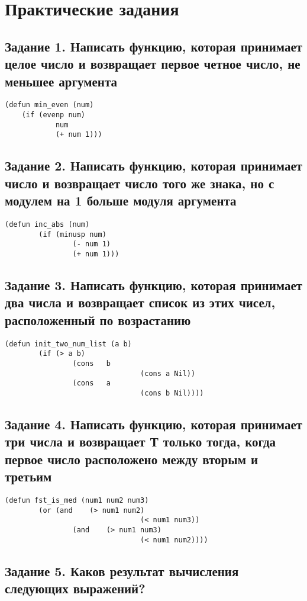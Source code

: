 \chapter{Практические задания}

\section{Задание 1. Написать функцию, которая принимает целое число и возвращает первое четное число, не меньшее аргумента}

\begin{lstlisting}
(defun min_even (num)
	(if (evenp num)
			num
			(+ num 1)))
\end{lstlisting}

\section{Задание 2. Написать функцию, которая принимает число и возвращает число того же знака, но с модулем на 1 больше модуля аргумента}

\begin{lstlisting}
(defun inc_abs (num)
		(if (minusp num)
				(- num 1)
				(+ num 1)))
\end{lstlisting}

\section{Задание 3. Написать функцию, которая принимает два числа и возвращает список из этих чисел, расположенный по возрастанию}

\begin{lstlisting}
(defun init_two_num_list (a b)
		(if (> a b)
				(cons   b
								(cons a Nil))
				(cons   a
								(cons b Nil))))
\end{lstlisting}

\section{Задание 4. Написать функцию, которая принимает три числа и возвращает Т только тогда, когда первое число расположено между вторым и третьим}

\begin{lstlisting}
(defun fst_is_med (num1 num2 num3)
		(or (and    (> num1 num2)
								(< num1 num3))
				(and    (> num1 num3)
								(< num1 num2))))
\end{lstlisting}

\section{Задание 5. Каков результат вычисления следующих выражений?}

